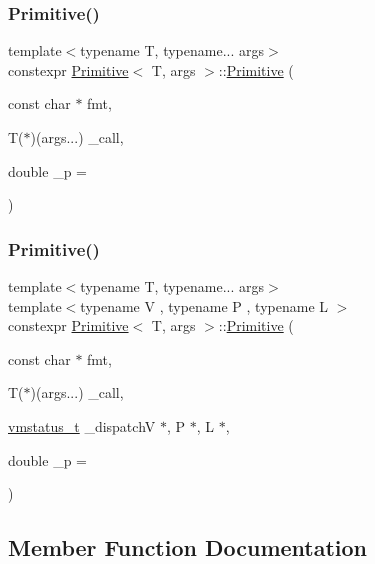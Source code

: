 \subsubsection{\texorpdfstring{Primitive()}{Primitive()}\hspace{0.1cm}{\footnotesize\ttfamily [1/2]}}
{\footnotesize\ttfamily template$<$typename T, typename... args$>$ \\
constexpr \hyperlink{struct_primitive}{Primitive}$<$ T, args $>$\+::\hyperlink{struct_primitive}{Primitive} (\begin{DoxyParamCaption}\item[{const char $\ast$}]{fmt,  }\item[{T($\ast$)(args...)}]{\+\_\+call,  }\item[{double}]{\+\_\+p = {} }\end{DoxyParamCaption})\hspace{0.3cm}{\ttfamily [inline]}}

\mbox{\label{struct_primitive_a8a9ad9e0b9c7bc94bbb4290cb298288c}} 
\subsubsection{\texorpdfstring{Primitive()}{Primitive()}\hspace{0.1cm}{\footnotesize\ttfamily [2/2]}}
{\footnotesize\ttfamily template$<$typename T, typename... args$>$ \\
template$<$typename V , typename P , typename L $>$ \\
constexpr \hyperlink{struct_primitive}{Primitive}$<$ T, args $>$\+::\hyperlink{struct_primitive}{Primitive} (\begin{DoxyParamCaption}\item[{const char $\ast$}]{fmt,  }\item[{T($\ast$)(args...)}]{\+\_\+call,  }\item[{\hyperlink{_instruction_8h_a6202215407ab29590bb936ca2996cf64}{vmstatus\+\_\+t} }]{\+\_\+dispatchV $\ast$, P $\ast$, L $\ast$,  }\item[{double}]{\+\_\+p = {} }\end{DoxyParamCaption})\hspace{0.3cm}{\ttfamily [inline]}}



\subsection{Member Function Documentation}
\mbox{\label{struct_primitive_a10cedec90ed4a3ff01be2bd3b9c36528}} 
